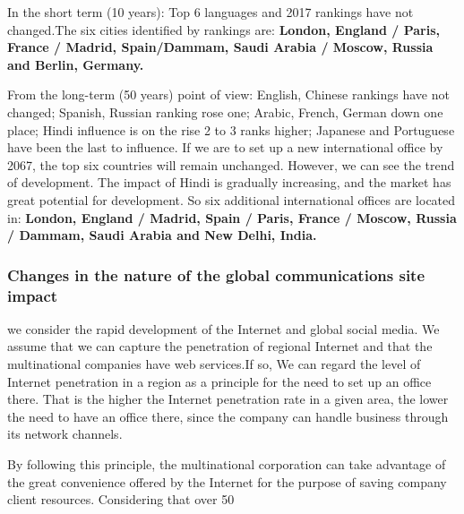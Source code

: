 \par In the short term (10 years): Top 6 languages and 2017 rankings have not changed.The six cities identified by rankings are: \textbf{London, England / Paris, France / Madrid, Spain/Dammam, Saudi Arabia / Moscow, Russia and Berlin, Germany.}
\par From the long-term (50 years) point of view: English, Chinese rankings have not changed; Spanish, Russian ranking rose one; Arabic, French, German down one place; Hindi influence is on the rise 2 to 3 ranks higher; Japanese and Portuguese have been the last to influence. If we are to set up a new international office by 2067, the top six countries will remain unchanged. However, we can see the trend of development. The impact of Hindi is gradually increasing, and the market has great potential for development. So six additional international offices are located in:\textbf{ London, England / Madrid, Spain / Paris, France / Moscow, Russia / Dammam, Saudi Arabia and New Delhi, India.}

\subsubsection{Changes in the nature of the global communications site impact} 
\noindent we consider the rapid development of the Internet and global social media. We assume that we can capture the penetration of regional Internet and that the multinational companies have web services.If so, We can regard the level of Internet penetration in a region as a principle for the need to set up an office there. That is the higher the Internet penetration rate in a given area, the lower the need to have an office there, since the company can handle business through its network channels.
\par By following this principle, the multinational corporation can take advantage of the great convenience offered by the Internet for the purpose of saving company client resources. Considering that over 50%

 
